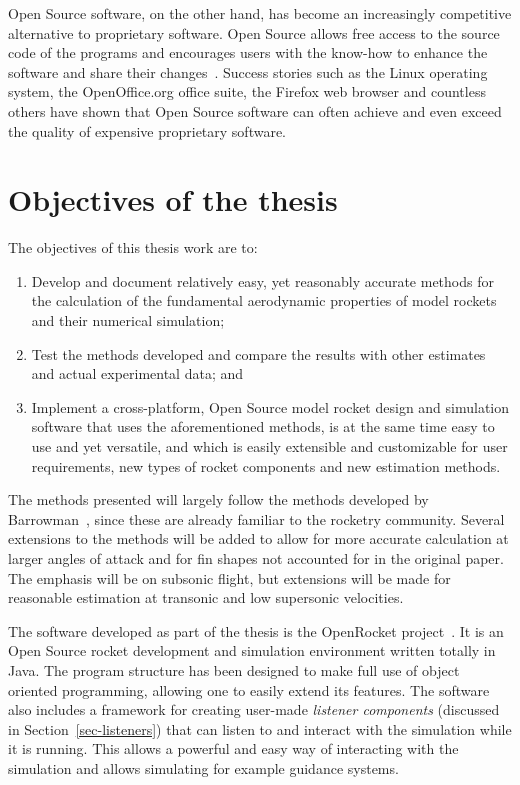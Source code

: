 Open Source software, on the other hand, has become an increasingly
competitive alternative to proprietary software.  Open Source allows
free access to the source code of the programs and encourages
users with the know-how to enhance the software and share their
changes~\cite{oss-principles}.  Success stories such as the Linux
operating system, the OpenOffice.org office suite, the Firefox web
browser and countless others have shown that Open Source software can
often achieve and even exceed the quality of expensive proprietary
software.


\section{Objectives of the thesis}

The objectives of this thesis work are to:
%
\begin{enumerate}
\item Develop and document relatively easy, yet reasonably accurate
  methods for the calculation of the fundamental aerodynamic
  properties of model rockets and their numerical simulation;

\item Test the methods developed and compare the results with other
  estimates and actual experimental data; and

\item Implement a cross-platform, Open Source model rocket design and
  simulation software that uses the aforementioned methods, is at the
  same time easy to use and yet versatile, and which is easily
  extensible and customizable for user requirements, new types of rocket
  components and new estimation methods.
\end{enumerate}

The methods presented will largely follow the methods developed by
Barrowman~\cite{barrowman-rd,barrowman-thesis}, since these are
already familiar to the rocketry community.  Several extensions to the
methods will be added to allow for more accurate calculation at larger
angles of attack and for fin shapes not accounted for in the original
paper.  The emphasis will be on subsonic flight, but extensions will
be made for reasonable estimation at transonic and low supersonic
velocities.

The software developed as part of the thesis is the OpenRocket
project~\cite{openrocket}.  It is an Open Source rocket development
and simulation environment written totally in Java.  The program
structure has been designed to make full use of object oriented
programming, allowing one to easily extend its features.  The software
also includes a framework for creating user-made 
{\it listener components} (discussed in Section~\ref{sec-listeners})
that can listen to and interact with the simulation while it is
running.  This allows a powerful and easy way of interacting with the
simulation and allows simulating for example guidance systems.


